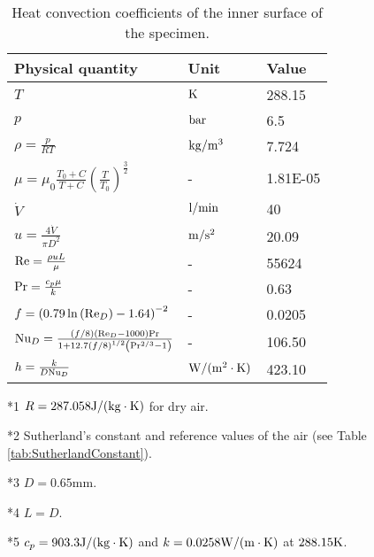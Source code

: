 \documentclass{article}
\begin{document}
\begin{table}[htbp]
  \begin{threeparttable}
  \centering
  \caption{Heat convection coefficients of the inner surface of the specimen.}
    \begin{tabular}{p{6cm}p{2.5cm}p{2.5cm}}
    \toprule
    Physical quantity   & Unit & Value  \\
    \midrule
    $T$   & ${\rm{K}}$ & 288.15  \\
    $p$   & ${\rm{bar}}$ & 6.5   \\
    $\rho  = \frac{p}{{RT}}$ \tnote{*1} & ${\rm{kg/}}{{\rm{m}}^{\rm{3}}}$ & 7.724 \\
    $\mu  = {\mu _0}\frac{{{T_0} + C}}{{T + C}}{\left( {\frac{T}{{{T_0}}}} \right)^{\frac{3}{2}}}$ \tnote{*2} & -     & 1.81E-05 \\
    ${\dot V}$ & ${\rm{l/min}}$ & 40  \\
    $u = \frac{{4\dot V}}{{\pi {D^2}}}$ \tnote{*3} & ${\rm{m/}}{{\rm{s}}^2}$ & 20.09  \\
    ${\rm{Re}} = \frac{{\rho uL}}{\mu }$ \tnote{*4} & -     & 55624  \\
    ${\rm{Pr}} = \frac{{{c_p}\mu }}{k}$ \tnote{*5} & -     & 0.63  \\
    $f = {\left( {0.79\ln \left( {{\rm{R}}{{\rm{e}}_D}} \right) - 1.64} \right)^{ - 2}}$ & -     & 0.0205  \\
    ${\rm{N}}{{\rm{u}}_D} = \frac{{\left( {f/8} \right)\left( {{\rm{R}}{{\rm{e}}_D} - 1000} \right){\rm{Pr}}}}{{1 + 12.7{{(f/8)}^{1/2}}\left( {{\rm{P}}{{\rm{r}}^{2/3}} - 1} \right)}}$ & -     & 106.50  \\
    $h = \frac{k}{{D{\rm{N}}{{\rm{u}}_D}}}$ & ${\rm{W/(}}{{\rm{m}}^{\rm{2}}} \cdot {\rm{K)}}$ & 423.10  \\
    \bottomrule
    \end{tabular}%
    \begin{tablenotes}
    \item[*1] $R = 287.058 {\rm{J/(kg}} \cdot {\rm{K}})$ for dry air.
    \item[*2] Sutherland's constant and reference values of the air (see Table \ref{tab:SutherlandConstant}).
    \item[*3] $D=0.65$mm.
    \item[*4] $L=D$.
    \item[*5] $c_{p}=903.3 {\rm{J/(kg}} \cdot {\rm{K}})$ and $k=0.0258 {\rm{W/(m}} \cdot {\rm{K}})$ at $288.15{\rm{K}}$.
    \end{tablenotes}
    \end{threeparttable}
  \label{tab:addlabel}%
\end{table}%
\end{document}
